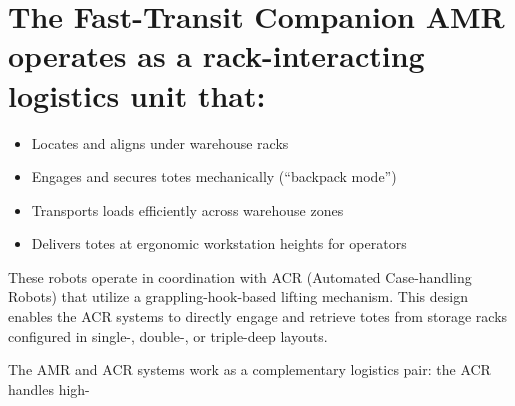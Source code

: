 \section*{The Fast-Transit Companion AMR operates as a rack-interacting logistics unit that:}

\begin{itemize}
    \item Locates and aligns under warehouse racks
    \item Engages and secures totes mechanically (``backpack mode'')
    \item Transports loads efficiently across warehouse zones
    \item Delivers totes at ergonomic workstation heights for operators
\end{itemize}

These robots operate in coordination with ACR (Automated Case-handling Robots) that utilize a grappling-hook-based lifting mechanism. This design enables the ACR systems to directly engage and retrieve totes from storage racks configured in single-, double-, or triple-deep layouts.

The AMR and ACR systems work as a complementary logistics pair: the ACR handles high-
